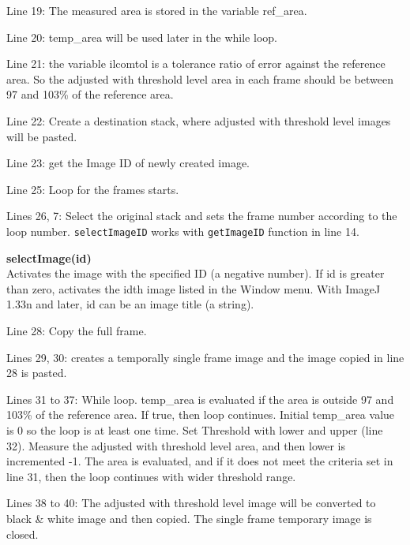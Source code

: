 \documentclass[11pt,a4paper,oneside]{report}
\newenvironment{indentCom}%
{\begin{list}{}%
         {\setlength{\leftmargin}{1em}}%
         \item[]%
}
{\end{list}}
\newcommand{\ilcom}[1]{\texttt{\small#1}}
\begin{document}
\begin{itemize}
\item Line 19: The measured area is stored in the variable ref\_area. 

\item Line 20: temp\_area will be used later in the while loop. 

\item Line 21: the variable ilcom{tol} is a tolerance ratio of error against the reference area. So the adjusted with threshold level area in each frame should be between 97 and 103\% of the reference area. 

\item Line 22: Create a destination stack, where adjusted with threshold level images will be pasted. 

\item Line 23: get the Image ID of newly created image. 

\item Line 25: Loop for the frames starts. 

\item Lines 26, 7: Select the original stack and sets the frame number according to the loop number. \ilcom{selectImageID} works with \ilcom{getImageID} function in line 14. 


\begin{indentCom}
\textbf{selectImage(id)}\\
Activates the image with the specified ID (a negative number). If id is greater than zero, activates the idth image listed in the Window menu. With ImageJ 1.33n and later, id can be an image title (a string).
\end{indentCom}

\item Line 28: Copy the full frame.

\item Lines 29, 30: creates a temporally single frame image and the image copied in line 28 is pasted. 

\item Lines 31 to 37: While loop. temp\_area is evaluated if the area is outside 97 and 103\% of the reference area. If true, then loop continues. Initial temp\_area value is 0 so the loop is at least one time. Set Threshold with lower and upper (line 32). Measure the adjusted with threshold level area, and then lower is incremented -1. The area is evaluated, and if it does not meet the criteria set in line 31, then the loop continues with wider threshold range. 

\item Lines 38 to 40: The adjusted with threshold level image will be converted to black \& white image and then copied. The single frame temporary image is closed.


\end{itemize}
\end{document}
